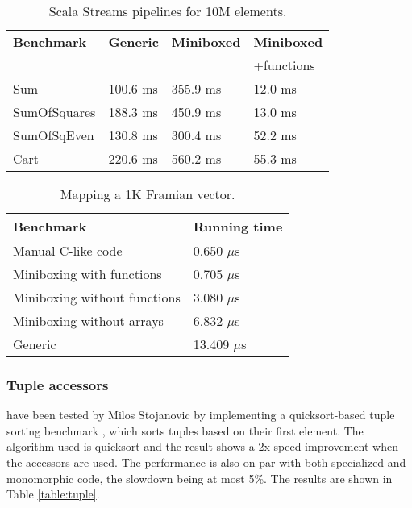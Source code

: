 \begin{table}[t]
  \begin{tabularx}{0.48\textwidth}{|g *{3}{|Y}|} \hline
    \textbf{Benchmark} & \textbf{Generic} & \textbf{Miniboxed}& \textbf{Miniboxed} \\
                       &                  &                   & +functions \\ \hline
    Sum              &              100.6 ms &              355.9 ms &             12.0 ms \\
    SumOfSquares     &              188.3 ms &              450.9 ms &             13.0 ms \\
    SumOfSqEven      &              130.8 ms &              300.4 ms &             52.2 ms \\
    Cart             &              220.6 ms &              560.2 ms &             55.3 ms \\ \hline
  \end{tabularx}
  \vspace{-2mm}
  \caption{Scala Streams pipelines for 10M elements.}
  \label{table:streams}
  \vspace{-1em}
\end{table}

\begin{table}[b]
  \begin{tabularx}{0.48\textwidth}{|g *{1}{|Y}|} \hline
    \textbf{Benchmark}             &  \textbf{Running time} \\ \hline
    Manual C-like code             &         0.650 $\mu$s \\
    Miniboxing with functions      &         0.705 $\mu$s \\
    Miniboxing without functions   &         3.080 $\mu$s \\
    Miniboxing without arrays      &         6.832 $\mu$s \\
    Generic                        &        13.409 $\mu$s \\ \hline
  \end{tabularx}
  \vspace{-2mm}
  \caption{Mapping a 1K Framian vector.}
  \label{table:framian}
  \vspace{-1em}
\end{table}

\subsubsection{Tuple accessors} have been tested by Milos Stojanovic by implementing a quicksort-based tuple sorting benchmark \cite{tuple-bench}, which sorts tuples based on their first element. The algorithm used is quicksort and the result shows a 2x speed improvement when the accessors are used. The performance is also on par with both specialized and monomorphic code, the slowdown being at most 5\%. The results are shown in Table \ref{table:tuple}.

